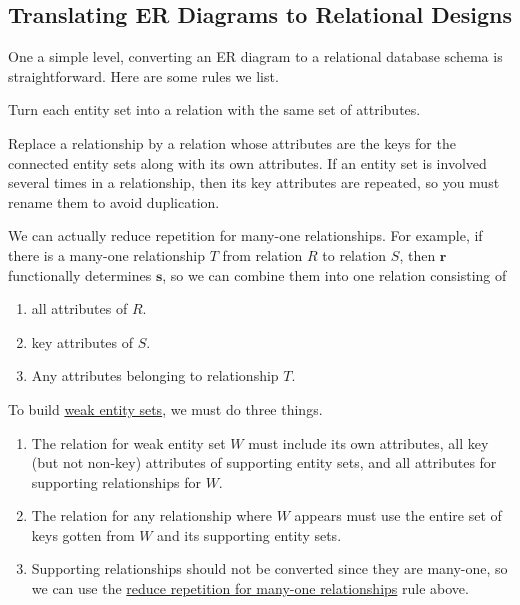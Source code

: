 \subsection{Translating ER Diagrams to Relational Designs}

  One a simple level, converting an ER diagram to a relational database schema is straightforward. Here are some rules we list. 

  \begin{theorem}
    \label{thm:converting-entity-sets}
    Turn each entity set into a relation with the same set of attributes. 
  \end{theorem}

  \begin{theorem}
    \label{thm:converting-relationships}
    Replace a relationship by a relation whose attributes are the keys for the connected entity sets along with its own attributes. If an entity set is involved several times in a relationship, then its key attributes are repeated, so you must rename them to avoid duplication.
  \end{theorem}

  \begin{theorem}
    \label{thm:reduce-repetition-for-many-one-relationships}
    We can actually reduce repetition for many-one relationships. For example, if there is a many-one relationship $T$ from relation $R$ to relation $S$, then $\mathbf{r}$ functionally determines $\mathbf{s}$, so we can combine them into one relation consisting of 
    \begin{enumerate}
      \item all attributes of $R$. 
      \item key attributes of $S$. 
      \item Any attributes belonging to relationship $T$. 
    \end{enumerate}
  \end{theorem}
  
  \begin{theorem}
    \label{thm:handling-weak-entity-sets}
    To build \hyperref[def:weak-entity-set]{weak entity sets}, we must do three things. 
    \begin{enumerate}
      \item The relation for weak entity set $W$ must include its own attributes, all key (but not non-key) attributes of supporting entity sets, and all attributes for supporting relationships for $W$. 
      \item The relation for any relationship where $W$ appears must use the entire set of keys gotten from $W$ and its supporting entity sets. 
      \item Supporting relationships should not be converted since they are many-one, so we can use the \hyperref[thm:reduce-repetition-for-many-one-relationships]{reduce repetition for many-one relationships} rule above. 
    \end{enumerate}
  \end{theorem}


